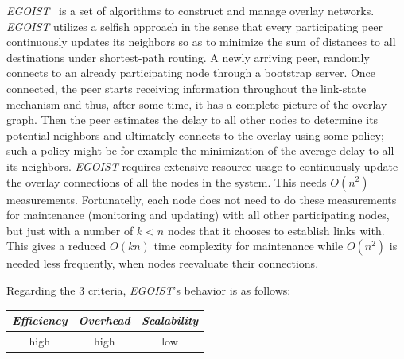 \emph{EGOIST}~\cite{SLLBBR2008} is a set of algorithms 
to construct and manage overlay networks. 
\emph{EGOIST} utilizes a selfish approach in the sense that every participating
peer continuously updates its neighbors so as to minimize the sum of distances
to all destinations under shortest-path routing. 
A newly arriving peer, randomly connects to an already participating 
node through a bootstrap server. Once connected, the peer starts receiving
information throughout the link-state mechanism and thus, after some time, 
it has a complete picture of the overlay graph. 
Then the peer estimates the delay to all other nodes to
determine its potential neighbors and ultimately connects 
to the overlay using some policy; such a policy might be 
for example the minimization of the average delay to all its
neighbors. \emph{EGOIST} requires extensive resource usage to continuously
update the overlay connections of all the nodes in the system. This needs
$O(n^2)$ measurements. Fortunatelly, each node does not need to do these
measurements for maintenance (monitoring and updating) with all other
participating nodes, but just with a number of $k<n$ nodes that it chooses to
establish links with. This gives a reduced $O(kn)$ time complexity for
maintenance while $O(n^2)$ is needed less frequently, when nodes reevaluate
their connections.

Regarding the $3$ criteria, \emph{EGOIST}'s behavior is as follows:
\begin{center}
{\footnotesize
\begin{tabular}{ccc}
\emph{Efficiency} & \emph{Overhead} & \emph{Scalability} \\
\hline
high &
high &
low
\end{tabular}
}
\end{center}

